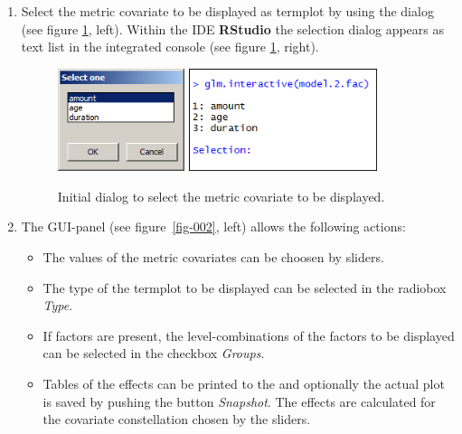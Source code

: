 \documentclass[nojss]{jss}
\begin{document}
\begin{enumerate}[leftmargin=1cm, rightmargin=0.5cm, label={\arabic{enumi}.}]
\item Select the metric covariate to be displayed as termplot by using the dialog (see figure \ref{fig-001}, left). Within the IDE \textbf{RStudio} the selection dialog appears as text list in the integrated console (see figure \ref{fig-001}, right). 

\begin{figure}[ht]
\centering 
\includegraphics[height=3cm, width=3.712cm]{fig-001-1}  \includegraphics[height=3cm, width=5.504cm]{fig-001-2}
\caption{Initial dialog to select the metric covariate to be displayed.}
\label{fig-001}
\end{figure}

\pagebreak

\item The GUI-panel (see figure~\ref{fig-002}, left) allows the following actions:
\begin{itemize} [leftmargin=0.5cm, rightmargin=0.5cm, label=$\bullet$]
\item The values of the metric covariates can be choosen by sliders. 
\item The type of the termplot to be displayed can be selected in the radiobox \textit{Type}.
\item If factors are present, the level-combinations of the factors to be displayed can be selected in the checkbox \textit{Groups}.
\item Tables of the effects can be printed to the  and optionally the actual plot is saved by pushing the button \textit{Snapshot}. The effects are calculated for the covariate constellation chosen by the sliders. 
\end{itemize}


\end{enumerate}
\end{document}
